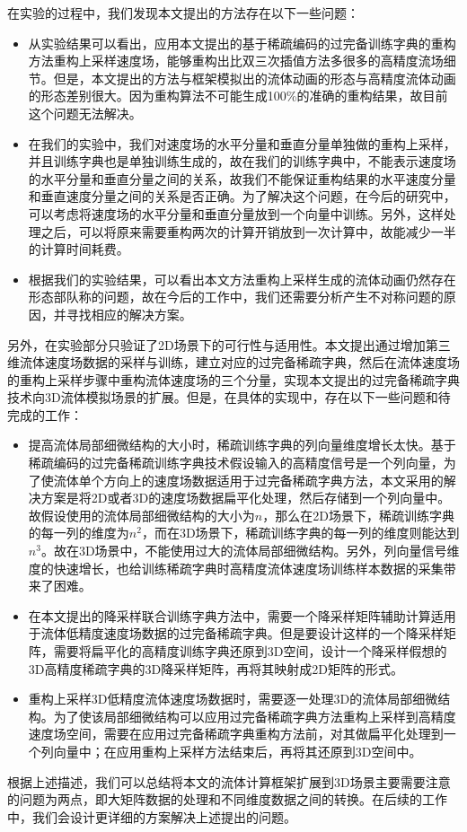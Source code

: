 在实验的过程中，我们发现本文提出的方法存在以下一些问题：

\begin{itemize}
\item 从实验结果可以看出，应用本文提出的基于稀疏编码的过完备训练字典的重构方法重构上采样速度场，能够重构出比双三次插值方法多很多的高精度流场细节。但是，本文提出的方法与框架模拟出的流体动画的形态与高精度流体动画的形态差别很大。因为重构算法不可能生成100\%的准确的重构结果，故目前这个问题无法解决。

\item 在我们的实验中，我们对速度场的水平分量和垂直分量单独做的重构上采样，并且训练字典也是单独训练生成的，故在我们的训练字典中，不能表示速度场的水平分量和垂直分量之间的关系，故我们不能保证重构结果的水平速度分量和垂直速度分量之间的关系是否正确。为了解决这个问题，在今后的研究中，可以考虑将速度场的水平分量和垂直分量放到一个向量中训练。另外，这样处理之后，可以将原来需要重构两次的计算开销放到一次计算中，故能减少一半的计算时间耗费。

\item 根据我们的实验结果，可以看出本文方法重构上采样生成的流体动画仍然存在形态部队称的问题，故在今后的工作中，我们还需要分析产生不对称问题的原因，并寻找相应的解决方案。

\end{itemize}

另外，在实验部分只验证了2D场景下的可行性与适用性。本文提出通过增加第三维流体速度场数据的采样与训练，建立对应的过完备稀疏字典，然后在流体速度场的重构上采样步骤中重构流体速度场的三个分量，实现本文提出的过完备稀疏字典技术向3D流体模拟场景的扩展。但是，在具体的实现中，存在以下一些问题和待完成的工作：

\begin{itemize}

\item 提高流体局部细微结构的大小时，稀疏训练字典的列向量维度增长太快。基于稀疏编码的过完备稀疏训练字典技术假设输入的高精度信号是一个列向量，为了使流体单个方向上的速度场数据适用于过完备稀疏字典方法，本文采用的解决方案是将2D或者3D的速度场数据扁平化处理，然后存储到一个列向量中。故假设使用的流体局部细微结构的大小为$n$，那么在2D场景下，稀疏训练字典的每一列的维度为$n^2$，而在3D场景下，稀疏训练字典的每一列的维度则能达到$n^3$。故在3D场景中，不能使用过大的流体局部细微结构。另外，列向量信号维度的快速增长，也给训练稀疏字典时高精度流体速度场训练样本数据的采集带来了困难。

\item 在本文提出的降采样联合训练字典方法中，需要一个降采样矩阵辅助计算适用于流体低精度速度场数据的过完备稀疏字典。但是要设计这样的一个降采样矩阵，需要将扁平化的高精度训练字典还原到3D空间，设计一个降采样假想的3D高精度稀疏字典的3D降采样矩阵，再将其映射成2D矩阵的形式。

\item 重构上采样3D低精度流体速度场数据时，需要逐一处理3D的流体局部细微结构。为了使该局部细微结构可以应用过完备稀疏字典方法重构上采样到高精度速度场空间，需要在应用过完备稀疏字典重构方法前，对其做扁平化处理到一个列向量中；在应用重构上采样方法结束后，再将其还原到3D空间中。

\end{itemize}

根据上述描述，我们可以总结将本文的流体计算框架扩展到3D场景主要需要注意的问题为两点，即大矩阵数据的处理和不同维度数据之间的转换。在后续的工作中，我们会设计更详细的方案解决上述提出的问题。

